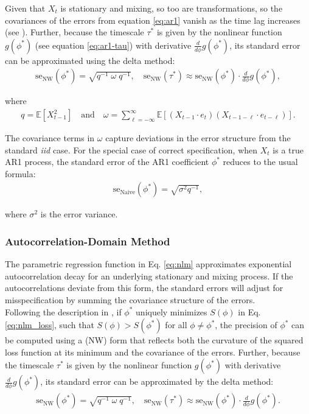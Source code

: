 \documentclass[docs/main.tex]{subfiles}
\begin{document}
Given that $X_t$ is stationary and mixing, so too are transformations, so the covariances of the errors from equation \eqref{eq:ar1} vanish as the time lag increases (see ). Further, because the timescale $\tau^*$ is given by the nonlinear function $g(\phi^*)$ (see equation \eqref{eq:ar1-tau}) with derivative $\frac{d}{d\phi} g(\phi^*)$, its standard error can be approximated using the delta method:
\begin{align}
    \text{se}_{\text{NW}}(\phi^*) = \sqrt{q^{-1}\; \omega \; q^{-1}} \label{eq:se-ar1-phi}, \quad
    \text{se}_{\text{NW}}(\tau^*) \approx \text{se}_{\text{NW}}(\phi^*) \cdot \frac{d}{d\phi} g(\phi^*),
\end{align}

\noindent where
\begin{align}
    q = \mathbb{E}[X_{t-1}^2] \quad\text{and}\quad \omega = \sum_{\ell=-\infty}^{\infty} \mathbb{E}[(X_{t-1} \cdot e_t)(X_{t-1-\ell} \cdot e_{t-\ell})].
\end{align}

\noindent The covariance terms in $\omega$ capture deviations in the error structure from the standard \textit{iid} case. For the special case of correct specification, when $X_t$ is a true AR1 process, the standard error of the AR1 coefficient $\phi^*$ reduces to the usual formula:
\begin{align}
    \text{se}_{\text{Naive}}(\phi^*) = \sqrt{\sigma^2 q^{-1}},
\end{align}

\noindent where $\sigma^2$ is the error variance. \\

\subsubsection{Autocorrelation-Domain Method}\label{sec:stderr-autocorrelation-domain}
The parametric regression function in Eq. \eqref{eq:nlm} approximates exponential autocorrelation decay for an underlying stationary and mixing process. If the autocorrelations deviate from this form, the standard errors will adjust for misspecification by summing the covariance structure of the errors.\\

Following the description in \citet[Chapter~22.8 and Chapter~23.5]{hansen_econometrics_2022}, if $\phi^*$ uniquely minimizes $S(\phi)$ in Eq. \eqref{eq:nlm_loss}, such that $S(\phi) > S(\phi^*)$ for all $\phi \neq \phi^*$, the precision of $\phi^*$ can be computed using a \citet{newey_simple_1987} (NW) form that reflects both the curvature of the squared loss function at its minimum and the covariance of the errors. Further, because the timescale $\tau^*$ is given by the nonlinear function $g(\phi^*)$ with derivative $\frac{d}{d\phi} g(\phi^*)$, its standard error can be approximated by the delta method:
\begin{align}\label{eq:stderr-autocorrelation-domain}
    \text{se}_\text{NW}(\phi^*) = \sqrt{q^{-1}\; \omega \;q^{-1}}, \quad \text{se}_\text{NW}(\tau^*) \approx \text{se}_\text{NW}(\phi^*) \cdot \frac{d}{d\phi}g(\phi^*).
\end{align}
\end{document}
